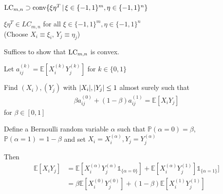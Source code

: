 \begin{frame}
	\begin{block}{$   \textup{LC}_{m,n}  \supset \textup{conv} \{  \xi\eta^T \, | \, \xi \in \{-1,1\}^m, \eta \in \{-1,1\}^n     \} $}
		\begin{itemize}
			 {\item $ \xi \eta^T \in LC_{m,n}  $ for all $\xi \in \{-1,1\}^m, \eta \in \{-1,1\}^n   $   \\
			 	(Choose $ X_i \equiv \xi_i, \, Y_j \equiv \eta_j $)}
			{\item Suffices to show that $ \textup{LC}_{m,n} $ is convex. }
			{\item Let $ a_{ij}^{(k)} = \mathbb{E}[X_i^{(k)}Y_{j}^{(k)}] $ for $ k \in \{0,1\} $}
			{\item Find $ (X_i),(Y_j) $ with $ {\left|{X_i}\right|},{\left|{Y_j}\right|} \le 1 $ almost surely such that
		\begin{align*}
				\beta a_{ij}^{(0)}+ (1-\beta)a_{ij}^{(1)} = \mathbb{E}[X_iY_j]
		\end{align*}
			for $ \beta \in [0,1] $}
		{\item Define a Bernoulli random variable $ \alpha $ such that $ \mathbb{P}(\alpha = 0) = \beta $, $ \mathbb{P}(\alpha = 1) = 1 - \beta$ and set $ X_i = X_i^{(\alpha)}, Y_j = Y_j^{(\alpha)} $}
		{\item Then 
			\begin{align*}
			\mathbb{E}[X_iY_j] &= \mathbb{E}[X_i^{(\alpha)}Y_j^{(\alpha)}  \mathds{1}_{ \{\alpha = 0\}}] + \mathbb{E}[X_i^{(\alpha)}Y_j^{(1)}]\mathds{1}_{\{\alpha = 1\}}] \\
			&= \beta \mathbb{E}[X_i^{(0)}Y_j^{(0)} ] + (1-\beta) \mathbb{E}[X_i^{(1)}Y_j^{(1)}]
			\end{align*}}
		\end{itemize}
	\end{block}
\end{frame}


